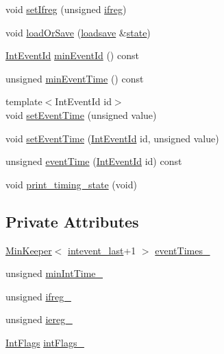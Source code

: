 \begin{DoxyCompactItemize}
\item 
void \hyperlink{classgambatte_1_1InterruptRequester_aafe73dd416a93e6044ed523072eb88ad}{set\+Ifreg} (unsigned \hyperlink{classgambatte_1_1InterruptRequester_ab38b7d0628b45719bbd8a4d2d7fd3d10}{ifreg})
\item 
void \hyperlink{classgambatte_1_1InterruptRequester_a55d66a6ca415d5bbe25de2b4f19524c9}{load\+Or\+Save} (\hyperlink{classgambatte_1_1loadsave}{loadsave} \&\hyperlink{ppu_8cpp_a2f2eca6997ee7baf8901725ae074d45b}{state})
\item 
\hyperlink{namespacegambatte_a0cc3dd7d4d26f0466e9eeda6242755d9}{Int\+Event\+Id} \hyperlink{classgambatte_1_1InterruptRequester_a252ee2f3d6908c81241a2d91c61198d9}{min\+Event\+Id} () const
\item 
unsigned \hyperlink{classgambatte_1_1InterruptRequester_ae8be681ef0489f392ec8c26080eed3c1}{min\+Event\+Time} () const
\item 
{\footnotesize template$<$Int\+Event\+Id id$>$ }\\void \hyperlink{classgambatte_1_1InterruptRequester_a74dea1d66d0f12cd30b8d40ad3e6d812}{set\+Event\+Time} (unsigned value)
\item 
void \hyperlink{classgambatte_1_1InterruptRequester_a1f89a9625dd3c710a380f83307f5185f}{set\+Event\+Time} (\hyperlink{namespacegambatte_a0cc3dd7d4d26f0466e9eeda6242755d9}{Int\+Event\+Id} id, unsigned value)
\item 
unsigned \hyperlink{classgambatte_1_1InterruptRequester_afbab70746a5eea63178d6fd927b27c18}{event\+Time} (\hyperlink{namespacegambatte_a0cc3dd7d4d26f0466e9eeda6242755d9}{Int\+Event\+Id} id) const
\item 
void \hyperlink{classgambatte_1_1InterruptRequester_a72b191ab4268068e248ab100d6981ea2}{print\+\_\+timing\+\_\+state} (void)
\end{DoxyCompactItemize}
\subsection*{Private Attributes}
\begin{DoxyCompactItemize}
\item 
\hyperlink{classMinKeeper}{Min\+Keeper}$<$ \hyperlink{namespacegambatte_a0cc3dd7d4d26f0466e9eeda6242755d9af6db597bb27febfcaf18fcf03e337906}{intevent\+\_\+last}+1 $>$ \hyperlink{classgambatte_1_1InterruptRequester_a251b9c79fc0a1f8dc05337b332bb5699}{event\+Times\+\_\+}
\item 
unsigned \hyperlink{classgambatte_1_1InterruptRequester_a2bdaa2560a52a5c12a80c470466bc8d0}{min\+Int\+Time\+\_\+}
\item 
unsigned \hyperlink{classgambatte_1_1InterruptRequester_a256e0604b1826e6ec9fc2b0aa9ab5c75}{ifreg\+\_\+}
\item 
unsigned \hyperlink{classgambatte_1_1InterruptRequester_a01927caeb6c58a09540a09eed75a8f4f}{iereg\+\_\+}
\item 
\hyperlink{classgambatte_1_1InterruptRequester_1_1IntFlags}{Int\+Flags} \hyperlink{classgambatte_1_1InterruptRequester_a3aedbf6de456171d28d5718671a5b43c}{int\+Flags\+\_\+}
\end{DoxyCompactItemize}


